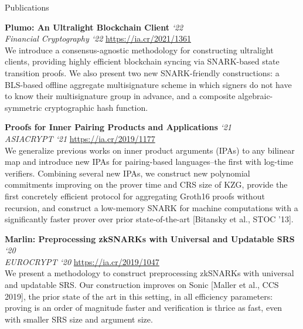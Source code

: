 \documentclass{cv}
\begin{document}
\begin{rSection}{Publications}

\textbf{Plumo: An Ultralight Blockchain Client} \hfill \emph{`22} \\
\emph{Financial Cryptography `22} \quad \url{https://ia.cr/2021/1361} \\
{\small We introduce a consensus-agnostic methodology for constructing ultralight clients, providing highly efficient blockchain syncing via SNARK-based state transition proofs. We also present two new SNARK-friendly constructions: a BLS-based offline aggregate multisignature scheme in which signers do not have to know their multisignature group in advance, and a composite algebraic-symmetric cryptographic hash function.}

\textbf{Proofs for Inner Pairing Products and Applications} \hfill \emph{`21} \\
\emph{ASIACRYPT `21} \quad \url{https://ia.cr/2019/1177} \\
{\small We generalize previous works on inner product arguments (IPAs) to any bilinear map and introduce new IPAs for pairing-based languages--the first with log-time verifiers. Combining several new IPAs, we construct new polynomial commitments improving on the prover time and CRS size of KZG, provide the first concretely efficient protocol for aggregating Groth16 proofs without recursion, and construct a low-memory SNARK for machine computations with a significantly faster prover over prior state-of-the-art [Bitansky et al., STOC '13].}

\textbf{Marlin: Preprocessing zkSNARKs with Universal and Updatable SRS} \hfill \emph{`20} \\
\emph{EUROCRYPT `20} \quad \url{https://ia.cr/2019/1047} \\
{\small We present a methodology to construct preprocessing zkSNARKs with universal and updatable SRS. Our construction improves on Sonic [Maller et al., CCS 2019], the prior state of the art in this setting, in all efficiency parameters: proving is an order of magnitude faster and verification is thrice as fast, even with smaller SRS size and argument size.}

\end{rSection}
\end{document}
